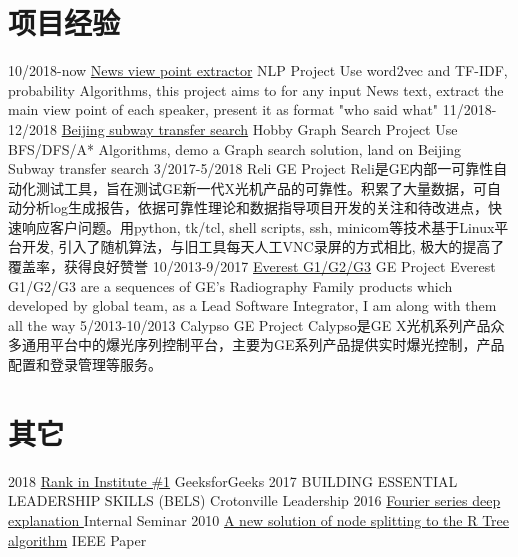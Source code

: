 \documentclass[letterpaper,10pt]{Resume_Liang}
\begin{document}
\begin{body}
\section{项目经验}
\begin{entrylist}
  \projectentry
    {10/2018-now}
    {\href{https://github.com/wangliangster/TestWL/blob/master/ViewPointExtract.ipynb}{News view point extractor}}
    {NLP Project}
    {Use word2vec and TF-IDF, probability Algorithms, this project aims to for any input News text, extract the main view point of each speaker, present it as format "who said what" }
  \projectentry
    {11/2018-12/2018}
    {\href{https://github.com/wangliangster/NLP-Course/blob/master/BeijingSubway.ipynb}{Beijing subway transfer search}}
    {Hobby Graph Search Project}
    {Use BFS/DFS/A* Algorithms, demo a Graph search solution, land on Beijing Subway transfer search}
    \projectentry
    {3/2017-5/2018}
    {Reli}
    {GE Project}
    {Reli是GE内部一可靠性自动化测试工具，旨在测试GE新一代X光机产品的可靠性。积累了大量数据，可自动分析log生成报告，依据可靠性理论和数据指导项目开发的关注和待改进点，快速响应客户问题。用python, tk/tcl, shell scripts, ssh, minicom等技术基于Linux平台开发, 引入了随机算法，与旧工具每天人工VNC录屏的方式相比, 极大的提高了覆盖率，获得良好赞誉}
     \projectentry
    {10/2013-9/2017}
    {\href{https://www.gehealthcare.com/en/products/radiography/fixed-rad-systems}{Everest G1/G2/G3}}
    {GE Project}
    {Everest G1/G2/G3 are a sequences of GE's Radiography Family products which developed by global team, as a Lead Software Integrator, I am along with them all the way  }
     \projectentry
    {5/2013-10/2013}
    {Calypso}
    {GE Project}
    {Calypso是GE X光机系列产品众多通用平台中的爆光序列控制平台，主要为GE系列产品提供实时爆光控制，产品配置和登录管理等服务。}
\end{entrylist}

\section{其它}
\begin{entrylist}
   \otherentry
   {2018}
   {\href{https://auth.geeksforgeeks.org/user/\%E7\%8E\%8B\%E8\%89\%AF/practice/}{Rank in Institute \#1}}
   {GeeksforGeeks}
    \otherentry
    {2017}
    {BUILDING ESSENTIAL LEADERSHIP SKILLS (BELS) }
    {Crotonville Leadership}
     \otherentry
    {2016}
    {\href{https://github.com/wangliangster/TestWL/blob/master/Fouries\%20Transfer\%20Notes3.pdf}{Fourier series deep explanation }}
    {Internal Seminar }
    \otherentry
    {2010}
    {\href{https://ieeexplore.ieee.org/document/5564214}{A new solution of node splitting to the R Tree algorithm}}
    {IEEE Paper}
\end{entrylist}
\end{body}
\end{document}
